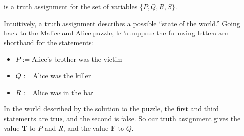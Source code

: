 \documentclass[letterpaper,10pt,english]{sphinxmanual}
\begin{document}
\sphinxAtStartPar
is a truth assignment for the set of variables \(\{ P, Q, R, S \}\).

\sphinxAtStartPar
Intuitively, a truth assignment describes a possible “state of the world.” Going back to the Malice and Alice puzzle, let’s suppose the following letters are shorthand for the statements:
\begin{itemize}
\item {} 
\sphinxAtStartPar
\(P\) := Alice’s brother was the victim

\item {} 
\sphinxAtStartPar
\(Q\) := Alice was the killer

\item {} 
\sphinxAtStartPar
\(R\) := Alice was in the bar

\end{itemize}

\sphinxAtStartPar
In the world described by the solution to the puzzle, the first and third statements are true, and the second is false. So our truth assignment gives the value \(\mathbf{T}\) to \(P\) and \(R\), and the value \(\mathbf{F}\) to \(Q\).
\end{document}
